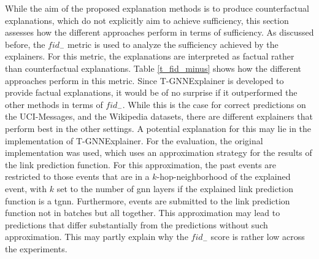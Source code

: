  While the aim of the proposed explanation methods is to produce counterfactual explanations, which do not explicitly aim to achieve sufficiency, this section assesses how the different approaches perform in terms of sufficiency. As discussed before, the $fid_-$ metric is used to analyze the sufficiency achieved by the explainers. For this metric, the explanations are interpreted as factual rather than counterfactual explanations. Table \ref{t_fid_minus} shows how the different approaches perform in this metric. Since T-GNNExplainer is developed to provide factual explanations, it would be of no surprise if it outperformed the other methods in terms of $fid_-$. While this is the case for correct predictions on the UCI-Messages, and the Wikipedia datasets, there are different explainers that perform best in the other settings. A potential explanation for this may lie in the implementation of T-GNNExplainer. For the evaluation, the original implementation was used, which uses an approximation strategy for the results of the link prediction function. For this approximation, the past events are restricted to those events that are in a $k$-hop-neighborhood of the explained event, with $k$ set to the number of \gls{gnn} layers if the explained link prediction function is a \gls{tgnn}. Furthermore, events are submitted to the link prediction function not in batches but all together. This approximation may lead to predictions that differ substantially from the predictions without such approximation. This may partly explain why the $fid_-$ score is rather low across the experiments.

